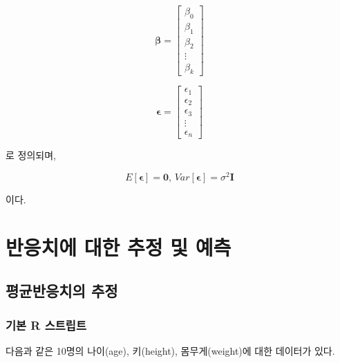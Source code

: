 \documentclass[
]{book}
\begin{document}
\[
\boldsymbol{\beta} = \left[ \begin{array}{c}
\beta_0 \\ \beta_1 \\ \beta_2 \\ \vdots \\ \beta_k
\end{array} \right]
\]

\[
\boldsymbol{\epsilon} = \left[ \begin{array}{c}
\epsilon_1 \\ \epsilon_2 \\ \epsilon_3 \\ \vdots \\ \epsilon_n
\end{array} \right]
\]

로 정의되며,

\[
E[\boldsymbol{\epsilon}] = \mathbf{0}, \, Var[\boldsymbol{\epsilon}] = \sigma^2 \mathbf{I} 
\]

이다.

\hypertarget{regression-response-confidence-prediction}{%
\section{반응치에 대한 추정 및 예측}\label{regression-response-confidence-prediction}}

\hypertarget{regression-response-confidence}{%
\subsection{평균반응치의 추정}\label{regression-response-confidence}}

\hypertarget{regression-response-confidence-basic-script}{%
\subsubsection{기본 R 스트립트}\label{regression-response-confidence-basic-script}}

다음과 같은 10명의 나이(age), 키(height), 몸무게(weight)에 대한 데이터가 있다.
\end{document}
